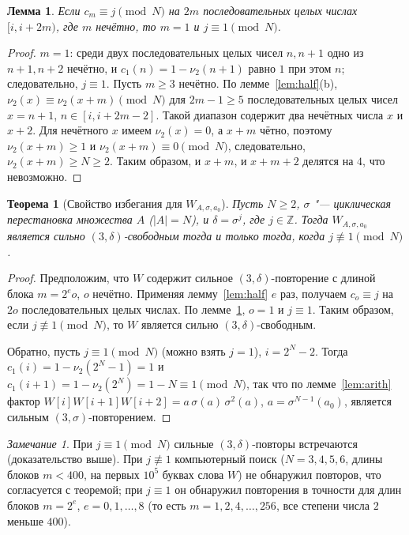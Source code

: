 \documentclass[a4paper,14pt]{extreport}
\theoremstyle{plain}
\newtheorem{theorem}{Теорема}[section]
\newtheorem{lemma}{Лемма}[section]
\theoremstyle{definition}
\theoremstyle{remark}
\newtheorem{remark}{Замечание}
\begin{document}
\begin{lemma}\label{lem:odd}
	Если $c_m\equiv j \pmod N$ на $2m$ последовательных целых числах $[i,i+2m)$, где $m$ нечётно, то $m=1$ и $j\equiv1\pmod N$.
\end{lemma}
\begin{proof}
	$m=1$: среди двух последовательных целых чисел $n,n+1$ одно из $n+1,n+2$ нечётно, и $c_1(n)=1-\nu_2(n+1)$ равно $1$ при этом $n$; следовательно, $j\equiv1$.
	Пусть $m\ge3$ нечётно. По лемме~\ref{lem:half}(b), $\nu_2(x)\equiv\nu_2(x+m)\pmod N$ для $2m-1\ge5$ последовательных целых чисел $x=n+1$, $n\in[i,i+2m-2]$.
	Такой диапазон содержит два нечётных числа $x$ и $x+2$. Для нечётного $x$ имеем $\nu_2(x)=0$, а $x+m$ чётно, поэтому $\nu_2(x+m)\ge1$ и $\nu_2(x+m)\equiv0\pmod N$, следовательно, $\nu_2(x+m)\ge N\ge2$.
	Таким образом, и $x+m$, и $x+m+2$ делятся на $4$, что невозможно.
\end{proof}

\begin{theorem}[Свойство избегания для $W_{A, \sigma, a_0}$]\label{avoidance}
	Пусть $N\ge2$, $\sigma$ "--- циклическая перестановка множества $A$ ($|A|=N$), и $\delta=\sigma^j$, где $j\in\mathbb Z$.
	Тогда $W_{A,\sigma,a_0}$ является сильно $(3,\delta)$-свободным тогда и только тогда, когда $j\not\equiv1\pmod N$.
\end{theorem}

\begin{proof}
	Предположим, что $W$ содержит сильное $(3,\delta)$-повторение с длиной блока $m=2^e o$, $o$ нечётно. Применяя лемму~\ref{lem:half} $e$ раз, получаем $c_o\equiv j$ на $2o$ последовательных целых числах.
	По лемме~\ref{lem:odd}, $o=1$ и $j\equiv1$. Таким образом, если $j\not\equiv1\pmod N$, то $W$ является сильно $(3,\delta)$-свободным.
	
	Обратно, пусть $j\equiv1\pmod N$ (можно взять $j=1$), $i=2^N-2$. Тогда $c_1(i)=1-\nu_2(2^N-1)=1$ и $c_1(i+1)=1-\nu_2(2^N)=1-N\equiv1\pmod N$, так что по лемме~\ref{lem:arith}
	фактор $W[i]W[i+1]W[i+2]=a\,\sigma(a)\,\sigma^2(a)$, $a=\sigma^{N-1}(a_0)$, является сильным $(3,\sigma)$-повторением.
\end{proof}

\begin{remark}
	При $j\equiv1\pmod N$ сильные $(3,\delta)$-повторы встречаются (доказательство выше). При $j\not\equiv1$ компьютерный поиск ($N=3,4,5,6$, длины блоков $m<400$, на первых $10^5$ буквах слова $W$) не обнаружил повторов, что согласуется с теоремой; при $j\equiv1$ он обнаружил повторения в точности для длин блоков $m=2^e$, $e=0,1,\dots,8$ (то есть $m=1,2,4,\dots,256$, все степени числа $2$ меньше $400$).
\end{remark}
\end{document}
